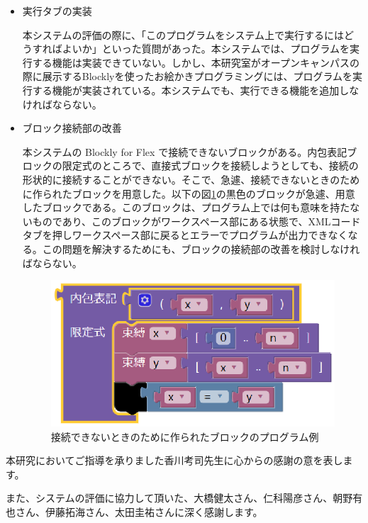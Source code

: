 \documentclass{eniepaper}
\begin{document}
\begin{itemize}
\item 実行タブの実装

本システムの評価の際に、「このプログラムをシステム上で実行するにはどうすればよいか」といった質問があった。本システムでは、プログラムを実行する機能は実装できていない。しかし、本研究室がオープンキャンパスの際に展示するBlocklyを使ったお絵かきプログラミングには、プログラムを実行する機能が実装されている。本システムでも、実行できる機能を追加しなければならない。

\item ブロック接続部の改善

本システムの Blockly for Flex で接続できないブロックがある。内包表記ブロックの限定式のところで、直接式ブロックを接続しようとしても、接続の形状的に接続することができない。そこで、急遽、接続できないときのために作られたブロックを用意した。以下の図\ref{fig:connection_bug}の黒色のブロックが急遽、用意したブロックである。このブロックは、プログラム上では何も意味を持たないものであり、このブロックがワークスペース部にある状態で、XMLコードタブを押しワークスペース部に戻るとエラーでプログラムが出力できなくなる。この問題を解決するためにも、ブロックの接続部の改善を検討しなければならない。

\begin{figure}[h]
\begin{center}
\includegraphics[scale=0.5]{img/connection_bug.eps}
\caption{接続できないときのために作られたブロックのプログラム例}%
\label{fig:connection_bug}
\end{center}%
\end{figure}%

\end{itemize} 
 

\acknowledgment  %

本研究においてご指導を承りました香川考司先生に心からの感謝の意を表します。

また、システムの評価に協力して頂いた、大橋健太さん、仁科陽彦さん、朝野有也さん、伊藤拓海さん、太田圭祐さんに深く感謝します。
\end{document}
